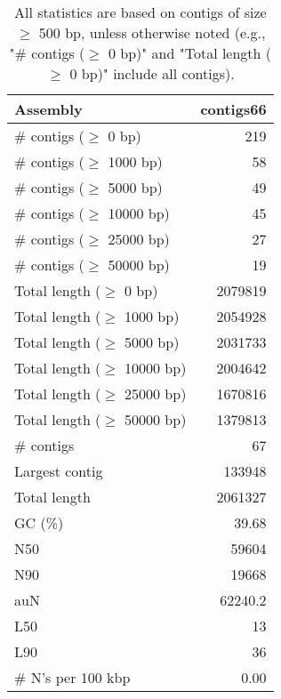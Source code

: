 \documentclass[12pt,a4paper]{article}
\begin{document}
\begin{table}[ht]
\begin{center}
\caption{All statistics are based on contigs of size $\geq$ 500 bp, unless otherwise noted (e.g., "\# contigs ($\geq$ 0 bp)" and "Total length ($\geq$ 0 bp)" include all contigs).}
\begin{tabular}{|l*{1}{|r}|}
\hline
Assembly & contigs66 \\ \hline
\# contigs ($\geq$ 0 bp) & 219 \\ \hline
\# contigs ($\geq$ 1000 bp) & 58 \\ \hline
\# contigs ($\geq$ 5000 bp) & 49 \\ \hline
\# contigs ($\geq$ 10000 bp) & 45 \\ \hline
\# contigs ($\geq$ 25000 bp) & 27 \\ \hline
\# contigs ($\geq$ 50000 bp) & 19 \\ \hline
Total length ($\geq$ 0 bp) & 2079819 \\ \hline
Total length ($\geq$ 1000 bp) & 2054928 \\ \hline
Total length ($\geq$ 5000 bp) & 2031733 \\ \hline
Total length ($\geq$ 10000 bp) & 2004642 \\ \hline
Total length ($\geq$ 25000 bp) & 1670816 \\ \hline
Total length ($\geq$ 50000 bp) & 1379813 \\ \hline
\# contigs & 67 \\ \hline
Largest contig & 133948 \\ \hline
Total length & 2061327 \\ \hline
GC (\%) & 39.68 \\ \hline
N50 & 59604 \\ \hline
N90 & 19668 \\ \hline
auN & 62240.2 \\ \hline
L50 & 13 \\ \hline
L90 & 36 \\ \hline
\# N's per 100 kbp & 0.00 \\ \hline
\end{tabular}
\end{center}
\end{table}
\end{document}
